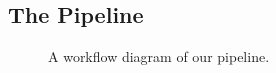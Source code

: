 \documentclass[10pt,twocolumn,letterpaper]{article}
\begin{document}
\subsection{The Pipeline}
\begin{figure}[t]
\begin{center}
\end{center}
   \caption{A workflow diagram of our pipeline.}
\label{fig:long}
\label{fig:onecol}
\end{figure}
\end{document}
